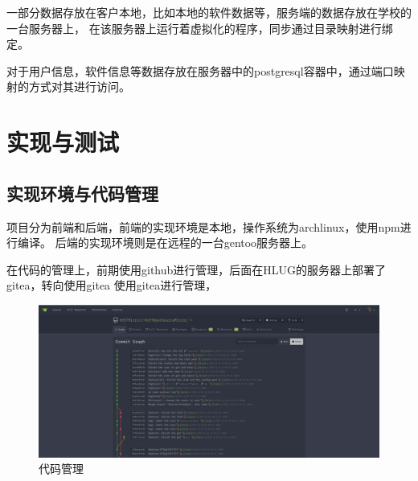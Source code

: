 \documentclass[supercite]{Experimental_Report}
\theoremstyle{definition}
\begin{document}
一部分数据存放在客户本地，比如本地的软件数据等，服务端的数据存放在学校的一台服务器上，
在该服务器上运行着虚拟化的程序，同步通过目录映射进行绑定。

对于用户信息，软件信息等数据存放在服务器中的postgresql容器中，通过端口映射的方式对其进行访问。

\section{实现与测试}

\subsection{实现环境与代码管理}

项目分为前端和后端，前端的实现环境是本地，操作系统为archlinux，使用npm进行编译。
后端的实现环境则是在远程的一台gentoo服务器上。

在代码的管理上，前期使用github进行管理，后面在HLUG的服务器上部署了gitea，转向使用gitea
使用gitea进行管理，

\begin{figure}[!h]
    \centering
    \includegraphics[width=1\textwidth]{./images/gitea.png}
    \caption{代码管理}
    \label{code}
\end{figure}
\end{document}
